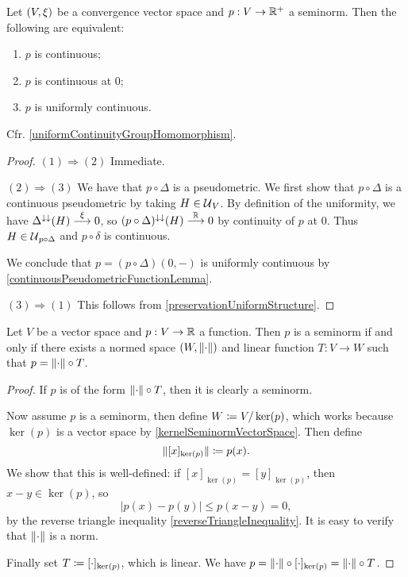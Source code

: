 \begin{proposition} \label{uniformContinuitySeminorms}
Let $\sSet{V,\xi}$ be a convergence vector space and $p: V\to \mathbb{R}^+$ a seminorm. Then the following are equivalent:
\begin{enumerate}
\item $p$ is continuous;
\item $p$ is continuous at $0$;
\item $p$ is uniformly continuous.
\end{enumerate}
\end{proposition}
Cfr. \ref{uniformContinuityGroupHomomorphism}.
\begin{proof}
$(1) \Rightarrow (2)$ Immediate.

$(2) \Rightarrow (3)$ We have that $p\circ \Delta$ is a pseudometric. We first show that $p\circ \Delta$ is a continuous pseudometric by taking $H\in \operatorname{\mathcal{U}}_V$. By definition of the uniformity, we have $\Delta^{\downarrow\downarrow}(H)\overset{\xi}{\longrightarrow} 0$, so $(p\circ \Delta)^{\downarrow\downarrow}(H) \overset{\mathbb{R}}{\longrightarrow} 0$ by continuity of $p$ at $0$. Thus $H\in \operatorname{\mathcal{U}}_{p\circ \Delta}$ and $p\circ \delta$ is continuous.

We conclude that $p = (p\circ \Delta)(0,-)$ is uniformly continuous by \ref{continuousPseudometricFunctionLemma}.

$(3) \Rightarrow (1)$ This follows from \ref{preservationUniformStructure}.
\end{proof}

\begin{proposition} \label{seminormFactorisation}
Let $V$ be a vector space and $p: V\to \mathbb{R}$ a function. Then $p$ is a seminorm \textup{if and only if} there exists a normed space $\sSet{W,\norm{\cdot}}$ and linear function $T: V\to W$ such that $p = \lVert\cdot\rVert\circ T$.
\end{proposition}
\begin{proof}
If $p$ is of the form $\lVert\cdot\rVert\circ T$, then it is clearly a seminorm.

Now assume $p$ is a seminorm, then define $W \coloneqq V/\ker(p)$, which works because $\ker(p)$ is a vector space by \ref{kernelSeminormVectorSpace}. Then define
\[ \lVert[x]_{\ker(p)}\rVert \coloneqq p(x). \]
We show that this is well-defined: if $[x]_{\ker(p)} = [y]_{\ker(p)}$, then $x-y\in \ker(p)$, so 
\[ |p(x) - p(y)| \leq p(x-y) = 0, \]
by the reverse triangle inequality \ref{reverseTriangleInequality}. It is easy to verify that $\lVert\cdot\rVert$ is a norm.

Finally set $T \coloneqq [\cdot]_{\ker(p)}$, which is linear. We have $p = \lVert\cdot\rVert\circ [\cdot]_{\ker(p)} = \lVert\cdot\rVert\circ T$.
\end{proof}

